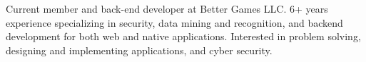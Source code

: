
\begin{cvparagraph}
Current member and back-end developer at Better Games LLC. 6+ years experience specializing in security, data mining and recognition, and backend development for both web and native applications. Interested in problem solving, designing and implementing applications, and cyber security.
\end{cvparagraph}
